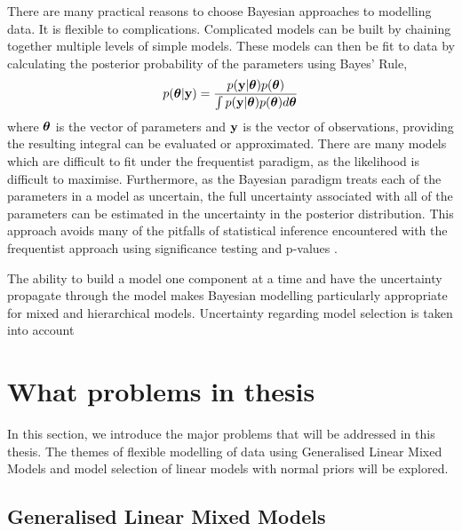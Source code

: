 There are many practical reasons to choose Bayesian approaches to modelling data.
It is flexible to complications. Complicated models can be built by chaining together multiple levels of
simple models. These models can then be fit to data by calculating the posterior probability of the
parameters using Bayes' Rule,
\[
	p({\boldsymbol \theta} | {\bf y}) = \frac{p({\bf y} | {\boldsymbol \theta}) p({\boldsymbol \theta})}{\int p({\bf y} | {\boldsymbol \theta}) p({\boldsymbol \theta}) d {\boldsymbol \theta}}
\]
where ${\boldsymbol \theta}$ is the vector of parameters and ${\bf y}$ is the vector of observations, providing the resulting
integral can be evaluated or approximated. There are many models which are difficult to fit under the
frequentist paradigm, as the likelihood is difficult to maximise. Furthermore, as the Bayesian paradigm treats
each of the parameters in a model as uncertain, the full uncertainty associated with all of the parameters can
be estimated in the uncertainty in the posterior distribution. This approach avoids many of the pitfalls of
statistical inference encountered with the frequentist approach using significance testing and p-values
\citep{Cox2005}.

The ability to build a model one component at a time and have the uncertainty propagate through the model makes Bayesian
modelling  particularly appropriate for mixed and hierarchical models. Uncertainty regarding model selection
is taken into account

\section{What problems in thesis}

In this section, we introduce the major problems that will be addressed in this thesis. The themes of flexible
modelling of data using Generalised Linear Mixed Models and model selection of linear models with normal
priors  will be explored.

\subsection{Generalised Linear Mixed Models}

